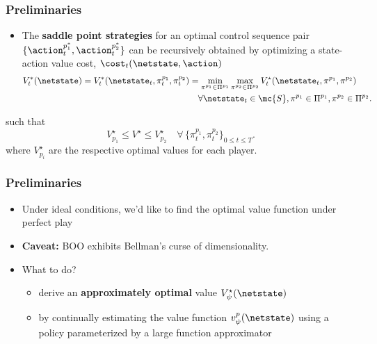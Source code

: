 \begin{frame}
	\frametitle{Preliminaries}
	\begin{itemize}
		\item The \textbf{saddle point strategies} for an optimal control sequence pair $\{\action^{p^*_1}_t, \action^{p^*_2}_t\}$  can be recursively obtained by optimizing a state-action value cost, $\cost_t(\netstate, \action)$ 
			\begin{align}
		V_t^*(\netstate) = V_t^*(\netstate_t, \pi^{p_1}_t, \pi^{p_2}_t) &= \min_{\pi^{p_1} \in \Pi^{p_1}} \max_{\pi^{p_2} \in \Pi^{p_2}} V^\star_t(\netstate_t, \pi^{p_1}, \pi^{p_2})  \nonumber \\
		& \quad \forall \netstate_t \in \mc{S}, \pi^{p_1} \in \Pi^{p_1}, \pi^{p_2} \in \Pi^{p_2}.
		\label{eq:minimax} \nonumber
		\end{align}
	\end{itemize}
	such that
	\[
	V^\star_{p_1} \le V^\star \le V^\star_{p_2} \quad \forall \,  \{\pi^{p_1}_t, \pi^{p_2}_t\}_{0 \le t\le T}.
	\]
	where $V^\star_{p_i}$ are the respective optimal values for each player. 
\end{frame}

\begin{frame}
%
	\frametitle{Preliminaries}
	\begin{itemize}
		\item Under ideal conditions, we'd like to find the optimal value function under perfect play
		\item \textbf{Caveat:} BOO exhibits Bellman's curse of dimensionality.
		\item What to do?
		\begin{itemize}
			\item derive an \textbf{approximately optimal} value $V_\psi^\star(\netstate)$
			\item by continually estimating the value function $v^p_\psi(\netstate)$ using \eg a policy parameterized by a large function approximator
		\end{itemize}  
	\end{itemize}
\end{frame}

